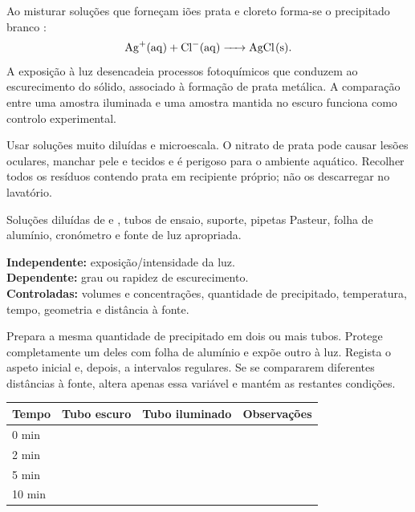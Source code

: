 \documentclass[11pt,a4paper,openany]{book}
\begin{document}
\begin{fundamento}
Ao misturar soluções que forneçam iões prata e cloreto forma-se o precipitado branco :
\[
\ce{Ag+(aq) + Cl-(aq) -> AgCl(s)}.
\]
A exposição à luz desencadeia processos fotoquímicos que conduzem ao escurecimento do sólido, associado à formação de prata metálica. A comparação entre uma amostra iluminada e uma amostra mantida no escuro funciona como controlo experimental.
\end{fundamento}

\begin{seguranca}
Usar soluções muito diluídas e microescala. O nitrato de prata pode causar lesões oculares, manchar pele e tecidos e é perigoso para o ambiente aquático. Recolher todos os resíduos contendo prata em recipiente próprio; não os descarregar no lavatório.
\end{seguranca}

\begin{material}
Soluções diluídas de  e , tubos de ensaio, suporte, pipetas Pasteur, folha de alumínio, cronómetro e fonte de luz apropriada.
\end{material}

\begin{variaveis}
\textbf{Independente:} exposição/intensidade da luz.\\
\textbf{Dependente:} grau ou rapidez de escurecimento.\\
\textbf{Controladas:} volumes e concentrações, quantidade de precipitado, temperatura, tempo, geometria e distância à fonte.
\end{variaveis}

\begin{metodo}
Prepara a mesma quantidade de precipitado em dois ou mais tubos. Protege completamente um deles com folha de alumínio e expõe outro à luz. Regista o aspeto inicial e, depois, a intervalos regulares. Se se compararem diferentes distâncias à fonte, altera apenas essa variável e mantém as restantes condições.
\end{metodo}

\begin{registo}
\begin{center}
\begin{tabular}{@{}llll@{}}
\toprule
Tempo & Tubo escuro & Tubo iluminado & Observações\\
\midrule
0 min & & &\\
2 min & & &\\
5 min & & &\\
10 min & & &\\
\bottomrule
\end{tabular}
\end{center}
\end{registo}
\end{document}
